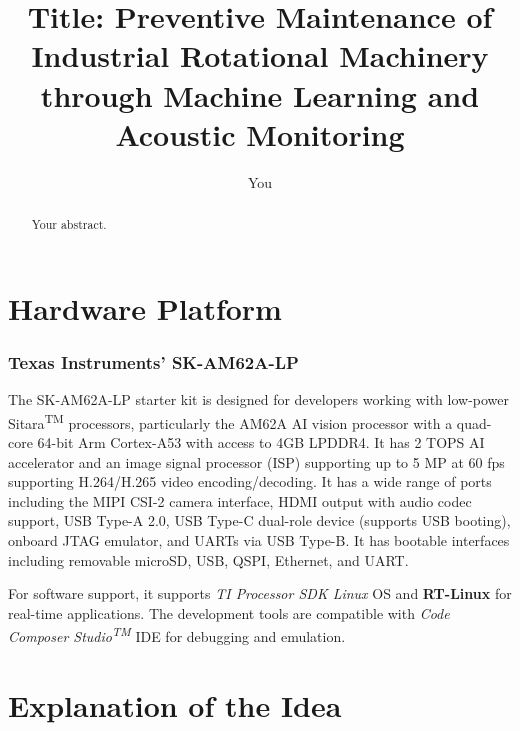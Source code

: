 \documentclass[12pt]{article}
\title{Title: Preventive Maintenance of Industrial Rotational Machinery through Machine Learning and Acoustic Monitoring}
\author{You}
\begin{document}
\maketitle

\begin{abstract}
Your abstract.
\end{abstract}

\section{Hardware Platform}

\subsubsection*{Texas Instruments’ SK-AM62A-LP}


The SK-AM62A-LP starter kit is designed for developers working with low-power Sitara\textsuperscript{TM} processors, particularly the AM62A AI vision processor with a quad-core 64-bit Arm Cortex-A53 with access to 4GB LPDDR4.
It has 2 TOPS AI accelerator and an image signal processor (ISP) supporting up to 5 MP at 60 fps supporting H.264/H.265 video encoding/decoding. 
It has a wide range of ports including the MIPI CSI-2 camera interface, HDMI output with audio codec support, USB Type-A 2.0, USB Type-C dual-role device (supports USB booting), onboard JTAG emulator, and UARTs via USB Type-B.
It has bootable interfaces including removable microSD, USB, QSPI, Ethernet, and UART.

For software support, it supports \textit{TI Processor SDK Linux} OS and \textbf{RT-Linux} for real-time applications. The development tools are compatible with \textit{Code Composer Studio\textsuperscript{TM}} IDE for debugging and emulation.

\section{Explanation of the Idea}
\end{document}
